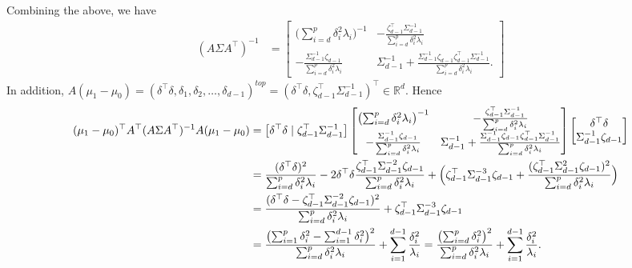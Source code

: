 \documentclass[10pt]{article}
\begin{document}
Combining the above, we have
\begin{equation}
\begin{split}
(A \Sigma A^{\top})^{-1} &= \begin{bmatrix} \bigl(\sum_{i=d}^{p} \delta_i^{2} \lambda_i\bigr)^{-1} & - \frac{\zeta_{d-1}^{\top} \Sigma_{d-1}^{-1}}{\sum_{i=d}^{p} \delta_i^{2} \lambda_i} \\
 - \frac{\Sigma_{d-1}^{-1} \zeta_{d-1}}{\sum_{i=d}^{p} \delta_i^{2} \lambda_i} 
  & \Sigma_{d-1}^{-1} + \frac{\Sigma_{d-1}^{-1} \zeta_{d-1} \zeta_{d-1}^{\top} \Sigma_{d-1}^{-1}}{\sum_{i=d}^{p} \delta_i^{2} \lambda_i}.
\end{bmatrix}
\end{split}
\end{equation}
In addition, $A(\mu_1 - \mu_0) = (\delta^{\top} \delta, \delta_1, \delta_2, \dots, \delta_{d-1})^{top} = (\delta^{\top} \delta, \zeta_{d-1}^{\top} \Sigma_{d-1}^{-1})^{\top} \in \mathbb{R}^{d}$. Hence
\begin{equation*} 
\begin{split}
(\mu_1 - \mu_0)^{\top} A^{\top} (A \Sigma A^{\top})^{-1} A (\mu_1 - \mu_0) &= 
\bigl[\delta^{\top} \delta \mid \zeta_{d-1}^{\top} \Sigma_{d-1}^{-1} \bigr] 
\begin{bmatrix} \bigl(\sum_{i=d}^{p} \delta_i^{2} \lambda_i\bigr)^{-1} & - \frac{\zeta_{d-1}^{\top} \Sigma_{d-1}^{-1}}{\sum_{i=d}^{p} \delta_i^{2} \lambda_i} \\
 - \frac{\Sigma_{d-1}^{-1} \zeta_{d-1}}{\sum_{i=d}^{p} \delta_i^{2} \lambda_i} 
  & \Sigma_{d-1}^{-1} + \frac{\Sigma_{d-1}^{-1} \zeta_{d-1} \zeta_{d-1}^{\top} \Sigma_{d-1}^{-1}}{\sum_{i=d}^{p} \delta_i^{2} \lambda_i} \end{bmatrix} \begin{bmatrix} \delta^{\top} \delta \\ \Sigma_{d-1}^{-1} \zeta_{d-1} \end{bmatrix} \\
  &= \frac{(\delta^{\top} \delta)^{2}}{\sum_{i=d}^{p} \delta_i^{2} \lambda_i} - 2 \delta^{\top} \delta \frac{\zeta_{d-1}^{\top} \Sigma_{d-1}^{-2} \zeta_{d-1}}{\sum_{i=d}^{p} \delta_i^2 \lambda_i} + \Bigl(\zeta_{d-1}^{\top} \Sigma_{d-1}^{-3} \zeta_{d-1} + \frac{(\zeta_{d-1}^{\top} \Sigma_{d-1}^{2} \zeta_{d-1})^{2}}{\sum_{i=d}^{p} \delta_i^{2} \lambda_i} \Bigr) \\
  &= \frac{(\delta^{\top} \delta - \zeta_{d-1}^{\top} \Sigma_{d-1}^{-2} \zeta_{d-1})^{2}}{\sum_{i=d}^{p} \delta_i^{2} \lambda_i} + \zeta_{d-1}^{\top} \Sigma_{d-1}^{-3} \zeta_{d-1} \\
  &= \frac{\bigl(\sum_{i=1}^{p} \delta_i^{2} - \sum_{i=1}^{d-1} \delta_i^{2}\bigr)^{2}}{\sum_{i=d}^{p} \delta_i^{2} \lambda_i} + \sum_{i=1}^{d-1} \frac{\delta_i^{2}}{\lambda_i} = \frac{\bigl(\sum_{i=d}^{p} \delta_i^{2}\bigr)^{2}}{\sum_{i=d}^{p} \delta_i^{2} \lambda_i} + \sum_{i=1}^{d-1} \frac{\delta_i^{2}}{\lambda_i}.
\end{split}
\end{equation*}
\end{document}
